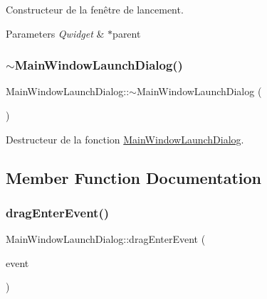 Constructeur de la fenêtre de lancement. 


\begin{DoxyParams}{Parameters}
{\em Qwidget} & $\ast$parent \\
\hline
\end{DoxyParams}
\mbox{\label{classMainWindowLaunchDialog_abf8a63fe899ba6d8fcbdf179122dfcb7}} 
\subsubsection{\texorpdfstring{$\sim$\+Main\+Window\+Launch\+Dialog()}{~MainWindowLaunchDialog()}}
{\footnotesize\ttfamily Main\+Window\+Launch\+Dialog\+::$\sim$\+Main\+Window\+Launch\+Dialog (\begin{DoxyParamCaption}{ }\end{DoxyParamCaption})}



Destructeur de la fonction \hyperlink{classMainWindowLaunchDialog}{Main\+Window\+Launch\+Dialog}. 



\subsection{Member Function Documentation}
\mbox{\label{classMainWindowLaunchDialog_aaf393173ffd6c63b2c4d5bdd48b8ddb4}} 
\subsubsection{\texorpdfstring{drag\+Enter\+Event()}{dragEnterEvent()}}
{\footnotesize\ttfamily Main\+Window\+Launch\+Dialog\+::drag\+Enter\+Event (\begin{DoxyParamCaption}\item[{Q\+Drag\+Enter\+Event $\ast$}]{event }\end{DoxyParamCaption})\hspace{0.3cm}{\ttfamily [private]}}



